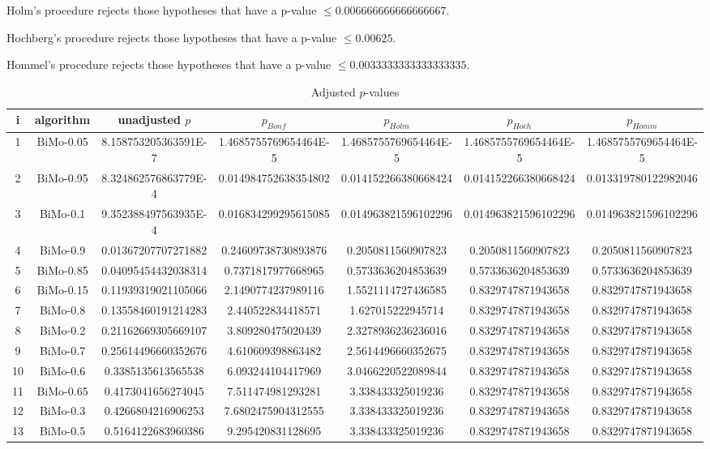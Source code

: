 \documentclass[a4paper,10pt]{article}
\begin{document}
\begin{landscape}
Holm's procedure rejects those hypotheses that have a p-value $\le0.006666666666666667$.


Hochberg's procedure rejects those hypotheses that have a p-value $\le0.00625$.


Hommel's procedure rejects those hypotheses that have a p-value $\le0.0033333333333333335$.


\begin{table}[!htp]
\centering\tiny
\caption{Adjusted $p$-values}
\begin{tabular}{ccccccc}
i&algorithm&unadjusted $p$&$p_{Bonf}$&$p_{Holm}$&$p_{Hoch}$&$p_{Homm}$\\
\hline
1&BiMo-0.05&8.158753205363591E-7&1.4685755769654464E-5&1.4685755769654464E-5&1.4685755769654464E-5&1.4685755769654464E-5\\
2&BiMo-0.95&8.324862576863779E-4&0.014984752638354802&0.014152266380668424&0.014152266380668424&0.013319780122982046\\
3&BiMo-0.1&9.352388497563935E-4&0.016834299295615085&0.014963821596102296&0.014963821596102296&0.014963821596102296\\
4&BiMo-0.9&0.01367207707271882&0.24609738730893876&0.2050811560907823&0.2050811560907823&0.2050811560907823\\
5&BiMo-0.85&0.04095454432038314&0.7371817977668965&0.5733636204853639&0.5733636204853639&0.5733636204853639\\
6&BiMo-0.15&0.11939319021105066&2.1490774237989116&1.5521114727436585&0.8329747871943658&0.8329747871943658\\
7&BiMo-0.8&0.13558460191214283&2.440522834418571&1.627015222945714&0.8329747871943658&0.8329747871943658\\
8&BiMo-0.2&0.21162669305669107&3.809280475020439&2.3278936236236016&0.8329747871943658&0.8329747871943658\\
9&BiMo-0.7&0.25614496660352676&4.610609398863482&2.5614496660352675&0.8329747871943658&0.8329747871943658\\
10&BiMo-0.6&0.3385135613565538&6.093244104417969&3.0466220522089844&0.8329747871943658&0.8329747871943658\\
11&BiMo-0.65&0.4173041656274045&7.511474981293281&3.338433325019236&0.8329747871943658&0.8329747871943658\\
12&BiMo-0.3&0.4266804216906253&7.6802475904312555&3.338433325019236&0.8329747871943658&0.8329747871943658\\
13&BiMo-0.5&0.5164122683960386&9.295420831128695&3.338433325019236&0.8329747871943658&0.8329747871943658\\

\end{tabular}
\end{table}
\end{landscape}
\end{document}
